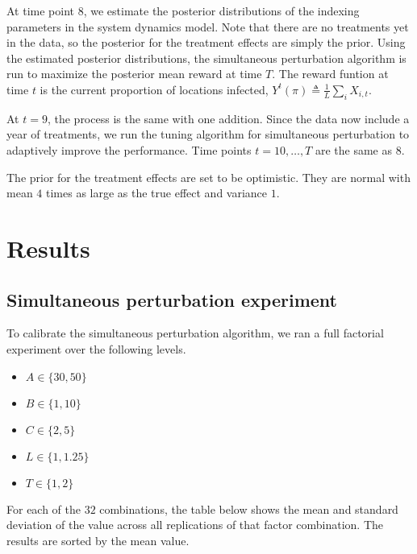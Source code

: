 \documentclass[11pt]{article}
\begin{document}
At time point $8$, we estimate the posterior distributions of the
indexing parameters in the system dynamics model.  Note that there
are no treatments yet in the data, so the posterior for the
treatment effects are simply the prior.  Using the estimated
posterior distributions, the simultaneous perturbation algorithm is
run to maximize the posterior mean reward at time $T$.  The reward
funtion at time $t$ is the current proportion of locations infected,
$Y^t(\pi) \triangleq \frac{1}{L}\sum_i X_{i,t}$.

At $t = 9$, the process is the same with one addition.  Since the
data now include a year of treatments, we run the tuning algorithm
for simultaneous perturbation to adaptively improve the performance.
Time points $t=10,\ldots,T$ are the same as $8$.

The prior for the treatment effects are set to be optimistic.  They
are normal with mean $4$ times as large as the true effect and
variance $1$.


\section{Results}
\label{sec-5}

\subsection{Simultaneous perturbation experiment}
\label{sec-5-1}

To calibrate the simultaneous perturbation algorithm, we ran a full
factorial experiment over the following levels.
\begin{itemize}
  \item $A \in \lbrace 30, 50 \rbrace $
  \item $B \in \lbrace 1, 10 \rbrace $
  \item $C \in \lbrace 2, 5 \rbrace $
  \item $L \in \lbrace 1, 1.25 \rbrace $
  \item $T \in \lbrace 1, 2 \rbrace $
\end{itemize}

For each of the $32$ combinations, the table below shows the mean and
standard deviation of the value across all replications of that factor
combination.  The results are sorted by the mean value.
\end{document}
